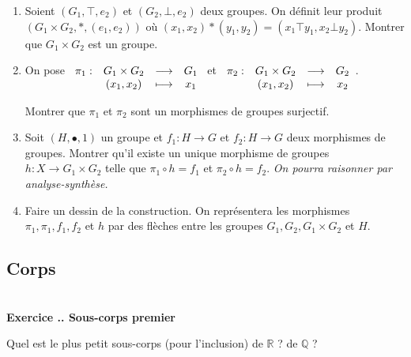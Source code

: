 \documentclass{article}
\newcommand{\fonction}[5]{\raisebox{-0.5\baselineskip}{$\begin{array}{lccc}
    #1: & #2 & \longrightarrow & #3 \\
        & #4 & \longmapsto & #5 \end{array}$}}
\newcommand{\mb}[1]{\mathbb{#1}}
\newcounter{exo}
\newcommand{\exercice}[1][\null]{\textbf{\\ Exercice \thesection.\theexo. #1} \addtocounter{exo}{1}}
\begin{document}
\begin{enumerate}

\item Soient $(G_1, \top, e_2)$ et $(G_2, \bot, e_2)$ deux groupes. On définit leur produit $(G_1 \times G_2, *, (e_1,e_2))$ où $(x_1,x_2)*(y_1,y_2) = (x_1 \top y_1, x_2 \bot y_2)$. Montrer que $G_1 \times G_2$ est un groupe.

\item On pose $\fonction{\pi_1}{G_1\times G_2}{G_1}{(x_1,x_2)}{x_1}$ et $\fonction{\pi_{2}}{G_1\times G_2}{G_2}{(x_1,x_2)}{x_2}$.

Montrer que $\pi_1$ et $\pi_2$ sont un morphismes de groupes surjectif.

\item Soit $(H, \bullet, 1)$ un groupe et $f_1 : H \rightarrow G$ et $f_2 : H \rightarrow G$ deux morphismes de groupes. Montrer qu'il existe un unique morphisme de groupes $h : X \rightarrow G_1\times G_2$ telle que $\pi_1 \circ h = f_1$ et $\pi_2 \circ h = f_2$.  \emph{On pourra raisonner par analyse-synthèse.}

\item Faire un dessin de la construction. On représentera les morphismes $\pi_1, \pi_1, f_1, f_2$ et $h$ par des flèches entre les groupes $G_1, G_2, G_1 \times G_2$ et $H$.

\end{enumerate}



\subsection{Corps}

\exercice[Sous-corps premier]

Quel est le plus petit sous-corps (pour l'inclusion) de $\mb{R}$ ? de $\mb{Q}$ ?
\end{document}
